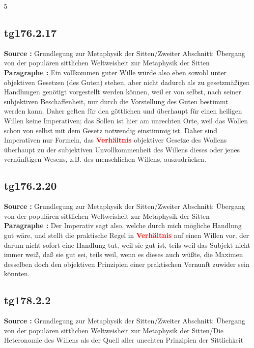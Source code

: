 \documentclass[a4paper,12pt,twoside]{book}
\newcommand{\match}[1]{\textcolor{red}{\textbf{#1}}}
\begin{document}
	
	5
	
	
	
	\subsection*{tg176.2.17} 
	\textbf{Source : }Grundlegung zur Metaphysik der Sitten/Zweiter Abschnitt: Übergang von der populären sittlichen Weltweisheit zur Metaphysik der Sitten\\  
	
	\textbf{Paragraphe : }Ein vollkommen guter Wille würde also eben sowohl unter objektiven Gesetzen (des Guten) stehen, aber nicht dadurch als zu gesetzmäßigen Handlungen genötigt vorgestellt werden können, weil er von selbst, nach seiner subjektiven Beschaffenheit, nur durch die Vorstellung des Guten  bestimmt werden kann. Daher gelten für den göttlichen und überhaupt für einen heiligen Willen keine Imperativen; das Sollen ist hier am unrechten Orte, weil das Wollen schon von selbst mit dem Gesetz notwendig einstimmig ist. Daher sind Imperativen nur Formeln, das \match{Verhältnis} objektiver Gesetze des Wollens überhaupt zu der subjektiven Unvollkommenheit des Willens dieses oder jenes vernünftigen Wesens, z.B. des menschlichen Willens, auszudrücken. 
	
	\subsection*{tg176.2.20} 
	\textbf{Source : }Grundlegung zur Metaphysik der Sitten/Zweiter Abschnitt: Übergang von der populären sittlichen Weltweisheit zur Metaphysik der Sitten\\  
	
	\textbf{Paragraphe : }Der Imperativ sagt also, welche durch mich mögliche Handlung gut wäre, und stellt die praktische Regel in \match{Verhältnis} auf einen Willen vor, der darum nicht sofort eine Handlung tut, weil sie gut ist, teils weil das Subjekt nicht immer weiß, daß sie gut sei, teils weil, wenn es dieses auch wüßte, die Maximen desselben doch den objektiven Prinzipien einer praktischen Vernunft zuwider sein könnten. 
	
	\subsection*{tg178.2.2} 
	\textbf{Source : }Grundlegung zur Metaphysik der Sitten/Zweiter Abschnitt: Übergang von der populären sittlichen Weltweisheit zur Metaphysik der Sitten/Die Heteronomie des Willens als der Quell aller unechten Prinzipien der Sittlichkeit\\  
	
\end{document}
